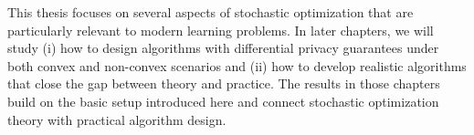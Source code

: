 
This thesis focuses on several aspects of stochastic optimization that are particularly relevant to modern learning problems. In later chapters, we will study (i) how to design algorithms with differential privacy guarantees under both convex and non-convex scenarios and (ii) how to develop realistic algorithms that close the gap between theory and practice. The results in those chapters build on the basic setup introduced here and connect stochastic optimization theory with practical algorithm design.

